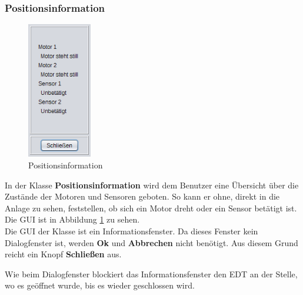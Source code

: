 \subsubsection{Positionsinformation} \label{subsubsec:Positionsinformation}
\begin{figure}
\vspace{-20pt}
  \begin{center}
    \includegraphics[width=0.25\textwidth]{Bilder/GUI/Positionsinformation}
  \end{center}
  \caption{Positionsinformation}
  \label{Positionsinformation}
  \vspace{-10pt}
\end{figure}
In der Klasse \textbf{Positionsinformation} wird dem Benutzer eine Übersicht über die Zustände der Motoren und Sensoren geboten. So kann er ohne, direkt in die Anlage zu sehen, feststellen, ob sich ein Motor dreht oder ein Sensor betätigt ist.
\\ Die \ac{GUI} ist in Abbildung \ref{Positionsinformation} zu sehen.
\\ Die \ac{GUI} der Klasse ist ein Informationsfenster. Da dieses Fenster kein Dialogfenster ist, werden \textbf{Ok} und \textbf{Abbrechen} nicht benötigt. Aus diesem Grund reicht ein Knopf \textbf{Schließen} aus.

\vspace{10pt}

Wie beim Dialogfenster blockiert das Informationsfenster den \ac{EDT} an der Stelle, wo es geöffnet wurde, bis es wieder geschlossen wird.

\vspace{10pt}

